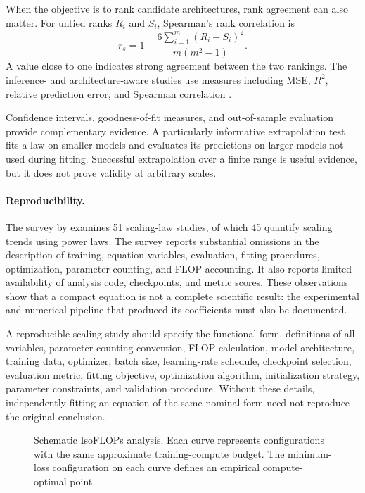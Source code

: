 When the objective is to rank candidate architectures, rank agreement can
also matter. For untied ranks \(R_i\) and \(S_i\), Spearman's rank
correlation is
\begin{equation}
    r_s
    =
    1-
    \frac{6\sum_{i=1}^{m}(R_i-S_i)^2}
         {m(m^2-1)}.
    \label{eq:scaling-spearman}
\end{equation}
A value close to one indicates strong agreement between the two rankings.
The inference- and architecture-aware studies use measures including MSE,
\(R^2\), relative prediction error, and Spearman correlation
\parencite{Bian2025InferenceEfficient,Bian2026ArchitectureScaling}.

Confidence intervals, goodness-of-fit measures, and out-of-sample evaluation
provide complementary evidence. A particularly informative extrapolation
test fits a law on smaller models and evaluates its predictions on larger
models not used during fitting. Successful extrapolation over a finite range
is useful evidence, but it does not prove validity at arbitrary scales.

\paragraph{Reproducibility.}
The survey by \textcite{Li2025MisFitting} examines 51 scaling-law studies,
of which 45 quantify scaling trends using power laws. The survey reports
substantial omissions in the description of training, equation variables,
evaluation, fitting procedures, optimization, parameter counting, and FLOP
accounting. It also reports limited availability of analysis code,
checkpoints, and metric scores. These observations show that a compact
equation is not a complete scientific result: the experimental and numerical
pipeline that produced its coefficients must also be documented.

A reproducible scaling study should specify the functional form, definitions
of all variables, parameter-counting convention, FLOP calculation, model
architecture, training data, optimizer, batch size, learning-rate schedule,
checkpoint selection, evaluation metric, fitting objective, optimization
algorithm, initialization strategy, parameter constraints, and validation
procedure. Without these details, independently fitting an equation of the
same nominal form need not reproduce the original conclusion.

\begin{figure}[htbp]
    \centering
    
    \caption{Schematic IsoFLOPs analysis. Each curve represents configurations
    with the same approximate training-compute budget. The minimum-loss
    configuration on each curve defines an empirical compute-optimal point.}
    \label{fig:scaling-isoflops}
\end{figure}


